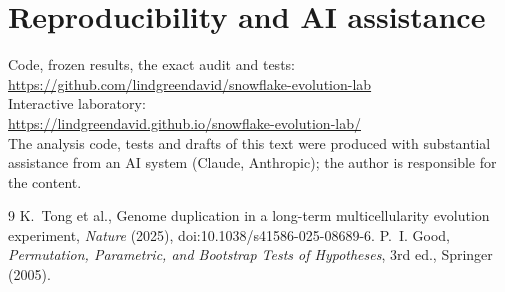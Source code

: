 \documentclass[11pt]{article}
\begin{document}
\section*{Reproducibility and AI assistance}
Code, frozen results, the exact audit and tests:\\
\url{https://github.com/lindgreendavid/snowflake-evolution-lab}\\
Interactive laboratory:\\
\url{https://lindgreendavid.github.io/snowflake-evolution-lab/}\\
The analysis code, tests and drafts of this text were produced with substantial assistance from an AI system (Claude, Anthropic);
the author is responsible for the content.

\begin{thebibliography}{9}
 K.~Tong et al., Genome duplication in a long-term multicellularity evolution experiment,
\emph{Nature} (2025), doi:10.1038/s41586-025-08689-6.
 P.~I. Good, \emph{Permutation, Parametric, and Bootstrap Tests of Hypotheses}, 3rd ed., Springer (2005).
\end{thebibliography}
\end{document}
